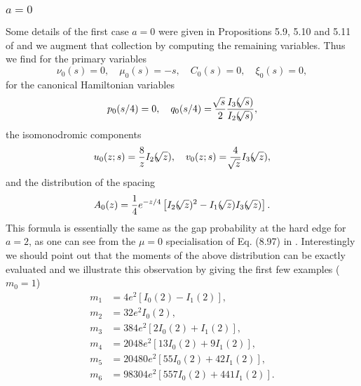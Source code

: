 \documentclass[10pt,reqno]{amsart}
\theoremstyle{plain}
\theoremstyle{definition}
\theoremstyle{remark}
\begin{document}
\subsubsection{$ a = 0 $}
Some details of the first case $ a=0 $ were given in Propositions 5.9, 5.10 and 5.11 of \cite{FW_2007} and 
we augment that collection by computing the remaining variables. Thus we find for the primary variables
\begin{equation}
 \nu_0(s) = 0, \quad \mu_0(s) = -s, \quad C_0(s) = 0, \quad \xi_0(s) = 0 ,
\end{equation}
for the canonical Hamiltonian variables
\begin{equation}
 p_0(s/4) = 0, \quad
 q_0(s/4) = \frac{{ \hspace{-0.5pt} \sqrt[]{{s}}}}{2}\frac{I_{3}({ \hspace{-0.5pt} \sqrt[]{{s}}})}{I_{2}({ \hspace{-0.5pt} \sqrt[]{{s}}})} ,
\label{H_a=0}
\end{equation}
the isomonodromic components
\begin{equation}
  u_0(z;s) = \frac{8}{z}I_{2}({ \hspace{-0.5pt} \sqrt[]{{z}}}), \quad
  v_0(z;s) = \frac{4}{{ \hspace{-0.5pt} \sqrt[]{{z}}}} I_{3}({ \hspace{-0.5pt} \sqrt[]{{z}}}) ,
\label{uv_a=0}
\end{equation}
and the distribution of the spacing
\begin{equation}
  A_0(z)=\frac{1}{4}e^{-z/4}\left[I_{2}({ \hspace{-0.5pt} \sqrt[]{{z}}})^2-I_{1}({ \hspace{-0.5pt} \sqrt[]{{z}}})I_{3}({ \hspace{-0.5pt} \sqrt[]{{z}}})\right] .
\end{equation} 
This formula is essentially the same as the gap probability at the hard edge for $ a=2 $, as one can see 
from the $ \mu=0 $ specialisation of Eq. (8.97) in \cite{rmt_Fo}. 
Interestingly we should point out that the moments of the above distribution can be exactly evaluated
and we illustrate this observation by giving the first few examples ($ m_0=1 $)
\begin{align*}
 m_1 & = 4e^2 \left[ I_0(2)-I_1(2) \right] ,
\\
 m_2 & = 32e^2 I_0(2) ,
\\
 m_3 & = 384e^2 \left[ 2I_0(2)+I_1(2) \right] ,
\\
 m_4 & = 2048e^2 \left[ 13I_0(2)+9I_1(2) \right] ,
\\
 m_5 & = 20480e^2 \left[ 55I_0(2)+42I_1(2) \right] ,
\\
 m_6 & = 98304e^2 \left[ 557I_0(2)+441I_1(2) \right] .
\end{align*}
\end{document}
